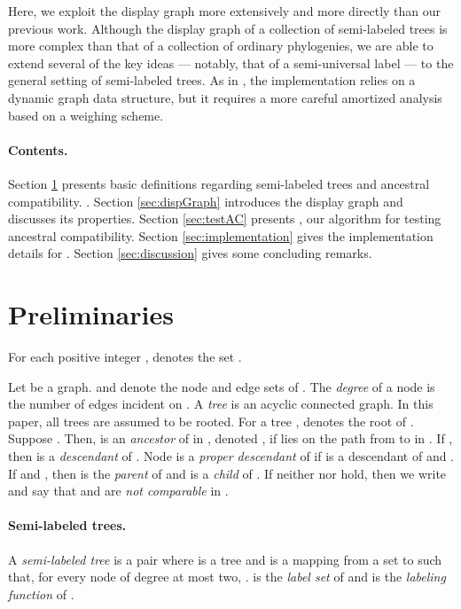 \documentclass[11pt]{article}
\theoremstyle{definition}
\begin{document}
Here, we exploit the display graph more extensively and more directly than our previous work.  Although the display graph of a collection of semi-labeled trees is more complex than that of a collection of  ordinary phylogenies, we are able to extend several of the key ideas --- notably, that of a semi-universal label --- to the general setting of semi-labeled trees.  As in \cite{DengFB2016}, the implementation relies on a dynamic graph data structure, but it requires a more careful amortized analysis based on a weighing scheme.

\vspace{-1.5\parsep}

\paragraph{Contents.} Section \ref{sec:prelims} presents basic definitions regarding semi-labeled trees and ancestral compatibility.  .  Section \ref{sec:dispGraph} introduces the display graph and discusses its properties.  Section \ref{sec:testAC} presents \SLBuild, our algorithm for testing ancestral compatibility.  Section \ref{sec:implementation} gives the implementation details for \SLBuild.  Section \ref{sec:discussion} gives some concluding remarks.

\section{Preliminaries}\label{sec:prelims}

For each positive integer ,  denotes the set .

Let  be a graph.  and  denote the node and edge sets of . The \emph{degree} of a node  is the number of edges incident on . A \emph{tree} is an acyclic connected graph.
In this paper, all trees are assumed to be rooted.  For a tree ,  denotes the root of . 
Suppose .  Then,  is an \emph{ancestor} of  in , denoted , if  lies on the path from  to  in .  If , then  is a \emph{descendant} of .  Node  is a \emph{proper descendant} of  if  is a descendant of  and . If  and , then   is the \emph{parent} of  and  is a \emph{child} of . If neither  nor   hold, then  we write  and say that  and  are \emph{not comparable} in . 

\vspace{-1.5\parsep}

\paragraph{Semi-labeled trees.} A \emph{semi-labeled tree} is a pair  where  is a tree and  is a mapping from a set  to  such that, for every node  of degree at most two, .   is the \emph{label set} of  and  is the \emph{labeling function} of .  
\end{document}
